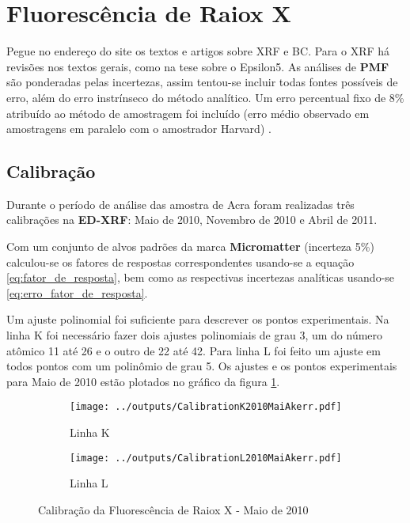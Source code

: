 \section{Fluorescência de Raiox X}
Pegue no endereço do site os textos e artigos sobre XRF e BC.
Para o XRF há revisões nos textos gerais, como na tese sobre o Epsilon5.
As análises de \textbf{PMF} são ponderadas pelas incertezas, assim 
tentou-se incluir todas fontes possíveis de erro, além do erro instrínseco 
do método analítico. Um erro percentual fixo de 8\% atribuído ao método 
de amostragem foi incluído 
(erro médio observado em amostragens em paralelo com o amostrador Harvard)
\citep{santos2014}.

\subsection{Calibração}

Durante o período de análise das amostra de Acra foram realizadas 
três calibrações na \textbf{ED-XRF}: Maio de 2010, Novembro de 2010
e Abril de 2011. 

Com um conjunto de alvos padrões da marca \textbf{Micromatter} 
(incerteza 5\%) calculou-se os fatores de respostas correspondentes
usando-se a equação \ref{eq:fator_de_resposta}, bem como as respectivas
incertezas analíticas usando-se \ref{eq:erro_fator_de_resposta}.

Um ajuste polinomial foi suficiente para descrever os pontos experimentais. 
Na linha K foi necessário fazer dois ajustes polinomiais de grau 3, um do 
número atômico 11 até 26 e o outro de 22 até 42. Para linha L foi 
feito um ajuste em todos pontos com um polinômio de grau 5.
Os ajustes e os pontos experimentais para Maio de 2010 estão plotados no 
gráfico da figura \ref{fig:edx_calib_KLmaio2010}.

\begin{figure}[H]
  \begin{subfigure}[b]{0.5\textwidth}
    \texttt{[image: ../outputs/CalibrationK2010MaiAkerr.pdf]}
    \caption{Linha K}
  \end{subfigure}%
  \begin{subfigure}[b]{0.5\textwidth}
    \texttt{[image: ../outputs/CalibrationL2010MaiAkerr.pdf]}
    \caption{Linha L}
  \end{subfigure}
  \caption{Calibração da Fluorescência de Raiox X - Maio de 2010 \label{fig:edx_calib_KLmaio2010}}
\end{figure}

